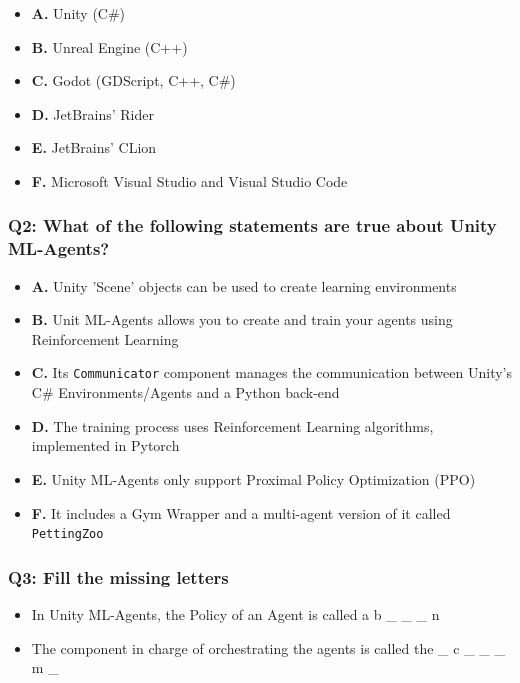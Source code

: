 \documentclass[11pt,a4paper]{article}
\begin{document}
\begin{itemize}
\tightlist
\item
  \textbf{A.} Unity (C\#)
\item
  \textbf{B.} Unreal Engine (C++)
\item
  \textbf{C.} Godot (GDScript, C++, C\#)
\item
  \textbf{D.} JetBrains' Rider
\item
  \textbf{E.} JetBrains' CLion
\item
  \textbf{F.} Microsoft Visual Studio and Visual Studio Code
\end{itemize}

\subsubsection{Q2: What of the following statements are true about Unity ML-Agents?}\label{q2-what-of-the-following-statements-are-true-about-unity-ml-agents}

\begin{itemize}
\tightlist
\item
  \textbf{A.} Unity 'Scene' objects can be used to create learning environments
\item
  \textbf{B.} Unit ML-Agents allows you to create and train your agents using Reinforcement Learning
\item
  \textbf{C.} Its \texttt{Communicator} component manages the communication between Unity's C\# Environments/Agents and a Python back-end
\item
  \textbf{D.} The training process uses Reinforcement Learning algorithms, implemented in Pytorch
\item
  \textbf{E.} Unity ML-Agents only support Proximal Policy Optimization (PPO)
\item
  \textbf{F.} It includes a Gym Wrapper and a multi-agent version of it called \texttt{PettingZoo}
\end{itemize}

\subsubsection{Q3: Fill the missing letters}\label{q3-fill-the-missing-letters}

\begin{itemize}
\tightlist
\item
  In Unity ML-Agents, the Policy of an Agent is called a b \_ \_ \_ n
\item
  The component in charge of orchestrating the agents is called the \_ c \_ \_ \_ m \_
\end{itemize}
\end{document}
